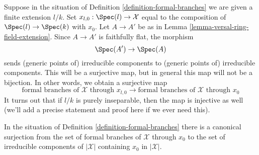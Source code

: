 \noindent
Suppose in the situation of Definition \ref{definition-formal-branches}
we are given a finite extension $l/k$. Set
$x_{l, 0} : \Spec(l) \to \mathcal{X}$ equal to the composition of
$\Spec(l) \to \Spec(k)$ with $x_0$. Let
$A \to A'$ be as in Lemma \ref{lemma-versal-ring-field-extension}.
Since $A \to A'$ is faithfully flat, the morphism
$$
\Spec(A') \to \Spec(A)
$$
sends (generic points of) irreducible components to
(generic points of) irreducible components.
This will be a surjective map, but
in general this map will not be a bijection.
In other words, we obtain a surjective map
$$
\text{formal branches of }\mathcal{X}\text{ through }x_{l, 0}
\longrightarrow
\text{formal branches of }\mathcal{X}\text{ through }x_0
$$
It turns out that if $l/k$ is purely inseparable, then
the map is injective as well (we'll add a precise statement
and proof here if we ever need this).

\begin{lemma}
\label{lemma-branches}
In the situation of Definition \ref{definition-formal-branches}
there is a canonical surjection from the set of formal branches of
$\mathcal{X}$ through $x_0$ to the set of irreducible components of
$|\mathcal{X}|$ containing $x_0$ in $|\mathcal{X}|$.
\end{lemma}

